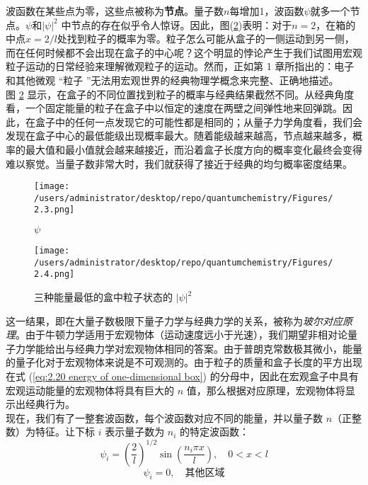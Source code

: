 	\indent 波函数在某些点为零，这些点被称为\textbf{节点}。量子数$n$每增加1，波函数$\psi$就多一个节点。$\psi$和$\left| \psi \right| ^2$ 中节点的存在似乎令人惊讶。因此，图(\ref{fig:2.4})表明：对于$n=2$，在箱的中点$x=2/l$处找到粒子的概率为零。粒子怎么可能从盒子的一侧运动到另一侧，而在任何时候都不会出现在盒子的中心呢？这个明显的悖论产生于我们试图用宏观粒子运动的日常经验来理解微观粒子的运动。然而，正如第 1 章所指出的：电子和其他微观 “粒子 ”无法用宏观世界的经典物理学概念来完整、正确地描述。\\
	\indent 图 \ref{fig:2.4} 显示，在盒子的不同位置找到粒子的概率与经典结果截然不同。从经典角度看，一个固定能量的粒子在盒子中以恒定的速度在两壁之间弹性地来回弹跳。因此，在盒子中的任何一点发现它的可能性都是相同的；从量子力学角度看，我们会发现在盒子中心的最低能级出现概率最大。随着能级越来越高，节点越来越多，概率的最大值和最小值就会越来越接近，而沿着盒子长度方向的概率变化最终会变得难以察觉。当量子数非常大时，我们就获得了接近于经典的均匀概率密度结果。
	\begin{figure}
		\centering
		\texttt{[image: /users/administrator/desktop/repo/quantumchemistry/Figures/2.3.png]}  %
		\caption{ $\psi$ }
		\label{fig:2.3}
	\end{figure}
	\begin{figure}
		\centering
		\texttt{[image: /users/administrator/desktop/repo/quantumchemistry/Figures/2.4.png]}  %
		\caption{{三种能量最低的盒中粒子状态的} $\left| \psi \right| ^2$ }
		\label{fig:2.4}
	\end{figure}
	\indent 这一结果，即在大量子数极限下量子力学与经典力学的关系，被称为\textit{玻尔对应原理}。由于牛顿力学适用于宏观物体（运动速度远小于光速），我们期望非相对论量子力学能给出与经典力学对宏观物体相同的答案。由于普朗克常数极其微小，能量的量子化对于宏观物体来说是不可观测的。由于粒子的质量和盒子长度的平方出现在式 (\ref{eq:2.20 energy of one-dimensional box}) 的分母中，因此在宏观盒子中具有宏观运动能量的宏观物体将具有巨大的 $n$ 值，那么根据对应原理，宏观物体将显示出经典行为。\\
	\indent 现在，我们有了一整套波函数，每个波函数对应不同的能量，并以量子数 $n$（正整数）为特征。让下标 $i$ 表示量子数为 $n_i$ 的特定波函数：
	\begin{equation*}
			\psi_i = \left(\frac{2}{l}\right)^{1/2} \sin\left(\frac{n_i\pi x}{l}\right), \quad  0<x<l
	\end{equation*}
	\begin{equation*}
		\psi_i = 0, \quad  \text{其他区域}
	\end{equation*}
